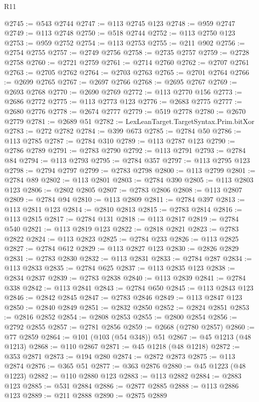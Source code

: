 \begin{lexlean}{R11}
\begin{coremodule}
@2745 := @543 @2744
@2747 := @113 @2745 @123
@2748 := @959 @2747
@2749 := @113 @2748
@2750 := @518 @2744
@2752 := @113 @2750 @123
@2753 := @959 @2752
@2754 := @113 @2753
@2755 := @211 @902
@2756 := @2754 @2755
@2757 := @2749 @2756
@2758 := @2735 @2757
@2759 := @2728 @2758
@2760 := @2721 @2759
@2761 := @2714 @2760
@2762 := @2707 @2761
@2763 := @2705 @2762
@2764 := @2703 @2763
@2765 := @2701 @2764
@2766 := @2699 @2765
@2767 := @2697 @2766
@2768 := @2695 @2767
@2769 := @2693 @2768
@2770 := @2690 @2769
@2772 := @113 @2770 @156
@2773 := @2686 @2772
@2775 := @113 @2773 @123
@2776 := @2683 @2775
@2777 := @2680 @2776
@2778 := @2674 @2777
@2779 := @519 @2778
@2780 := @2670 @2779
@2781 := @2689 @51
@2782 := LexLeanTarget.TargetSyntax.Prim.bitXor
@2783 := @272 @2782
@2784 := @399 @673
@2785 := @2784 @50
@2786 := @113 @2785
@2787 := @2784 @310
@2789 := @113 @2787 @123
@2790 := @2786 @2789
@2791 := @2783 @2790
@2792 := @113 @2791
@2793 := @2784 @84
@2794 := @113 @2793
@2795 := @2784 @357
@2797 := @113 @2795 @123
@2798 := @2794 @2797
@2799 := @2783 @2798
@2800 := @113 @2799
@2801 := @2784 @89
@2802 := @113 @2801
@2803 := @2784 @390
@2805 := @113 @2803 @123
@2806 := @2802 @2805
@2807 := @2783 @2806
@2808 := @113 @2807
@2809 := @2784 @94
@2810 := @113 @2809
@2811 := @2784 @397
@2813 := @113 @2811 @123
@2814 := @2810 @2813
@2815 := @2783 @2814
@2816 := @113 @2815
@2817 := @2784 @131
@2818 := @113 @2817
@2819 := @2784 @540
@2821 := @113 @2819 @123
@2822 := @2818 @2821
@2823 := @2783 @2822
@2824 := @113 @2823
@2825 := @2784 @233
@2826 := @113 @2825
@2827 := @2784 @612
@2829 := @113 @2827 @123
@2830 := @2826 @2829
@2831 := @2783 @2830
@2832 := @113 @2831
@2833 := @2784 @287
@2834 := @113 @2833
@2835 := @2784 @625
@2837 := @113 @2835 @123
@2838 := @2834 @2837
@2839 := @2783 @2838
@2840 := @113 @2839
@2841 := @2784 @338
@2842 := @113 @2841
@2843 := @2784 @650
@2845 := @113 @2843 @123
@2846 := @2842 @2845
@2847 := @2783 @2846
@2849 := @113 @2847 @123
@2850 := @2840 @2849
@2851 := @2832 @2850
@2852 := @2824 @2851
@2853 := @2816 @2852
@2854 := @2808 @2853
@2855 := @2800 @2854
@2856 := @2792 @2855
@2857 := @2781 @2856
@2859 := @2668 (@2780 @2857)
@2860 := @77 @2859
@2864 := @101 (@103 (@54 @348)) @51
@2867 := @45 @1213 (@48 @1213)
@2868 := @110 @2867
@2871 := @45 @1218 (@48 @1218)
@2872 := @353 @2871
@2873 := @194 @280
@2874 := @2872 @2873
@2875 := @113 @2874
@2876 := @365 @51
@2877 := @363 @2876
@2880 := @45 @1223 (@48 @1223)
@2882 := @110 @2880 @123
@2883 := @113 @2882
@2884 := @2883 @123
@2885 := @531 @2884
@2886 := @2877 @2885
@2888 := @113 @2886 @123
@2889 := @211 @2888
@2890 := @2875 @2889

\end{coremodule}
\end{lexlean}
